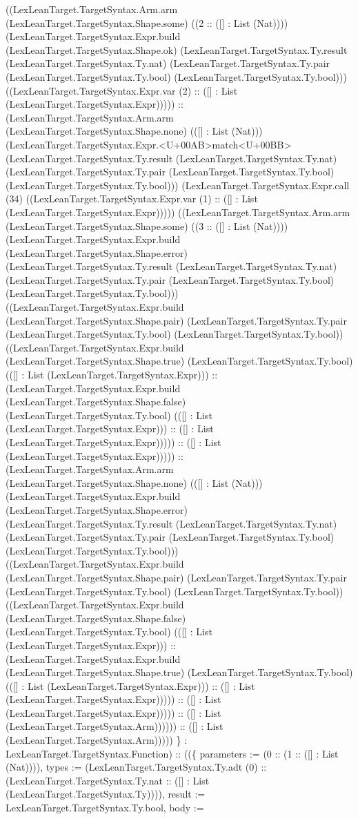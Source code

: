 \documentclass[11pt]{article}
\begin{document}
((LexLeanTarget.TargetSyntax.Arm.arm (LexLeanTarget.TargetSyntax.Shape.some) ((2 :: ([] : List (Nat)))) (LexLeanTarget.TargetSyntax.Expr.build (LexLeanTarget.TargetSyntax.Shape.ok) (LexLeanTarget.TargetSyntax.Ty.result (LexLeanTarget.TargetSyntax.Ty.nat) (LexLeanTarget.TargetSyntax.Ty.pair (LexLeanTarget.TargetSyntax.Ty.bool) (LexLeanTarget.TargetSyntax.Ty.bool))) ((LexLeanTarget.TargetSyntax.Expr.var (2) :: ([] : List (LexLeanTarget.TargetSyntax.Expr))))) :: (LexLeanTarget.TargetSyntax.Arm.arm (LexLeanTarget.TargetSyntax.Shape.none) (([] : List (Nat))) (LexLeanTarget.TargetSyntax.Expr.<U+00AB>match<U+00BB> (LexLeanTarget.TargetSyntax.Ty.result (LexLeanTarget.TargetSyntax.Ty.nat) (LexLeanTarget.TargetSyntax.Ty.pair (LexLeanTarget.TargetSyntax.Ty.bool) (LexLeanTarget.TargetSyntax.Ty.bool))) (LexLeanTarget.TargetSyntax.Expr.call (34) ((LexLeanTarget.TargetSyntax.Expr.var (1) :: ([] : List (LexLeanTarget.TargetSyntax.Expr))))) ((LexLeanTarget.TargetSyntax.Arm.arm (LexLeanTarget.TargetSyntax.Shape.some) ((3 :: ([] : List (Nat)))) (LexLeanTarget.TargetSyntax.Expr.build (LexLeanTarget.TargetSyntax.Shape.error) (LexLeanTarget.TargetSyntax.Ty.result (LexLeanTarget.TargetSyntax.Ty.nat) (LexLeanTarget.TargetSyntax.Ty.pair (LexLeanTarget.TargetSyntax.Ty.bool) (LexLeanTarget.TargetSyntax.Ty.bool))) ((LexLeanTarget.TargetSyntax.Expr.build (LexLeanTarget.TargetSyntax.Shape.pair) (LexLeanTarget.TargetSyntax.Ty.pair (LexLeanTarget.TargetSyntax.Ty.bool) (LexLeanTarget.TargetSyntax.Ty.bool)) ((LexLeanTarget.TargetSyntax.Expr.build (LexLeanTarget.TargetSyntax.Shape.true) (LexLeanTarget.TargetSyntax.Ty.bool) (([] : List (LexLeanTarget.TargetSyntax.Expr))) :: (LexLeanTarget.TargetSyntax.Expr.build (LexLeanTarget.TargetSyntax.Shape.false) (LexLeanTarget.TargetSyntax.Ty.bool) (([] : List (LexLeanTarget.TargetSyntax.Expr))) :: ([] : List (LexLeanTarget.TargetSyntax.Expr))))) :: ([] : List (LexLeanTarget.TargetSyntax.Expr))))) :: (LexLeanTarget.TargetSyntax.Arm.arm (LexLeanTarget.TargetSyntax.Shape.none) (([] : List (Nat))) (LexLeanTarget.TargetSyntax.Expr.build (LexLeanTarget.TargetSyntax.Shape.error) (LexLeanTarget.TargetSyntax.Ty.result (LexLeanTarget.TargetSyntax.Ty.nat) (LexLeanTarget.TargetSyntax.Ty.pair (LexLeanTarget.TargetSyntax.Ty.bool) (LexLeanTarget.TargetSyntax.Ty.bool))) ((LexLeanTarget.TargetSyntax.Expr.build (LexLeanTarget.TargetSyntax.Shape.pair) (LexLeanTarget.TargetSyntax.Ty.pair (LexLeanTarget.TargetSyntax.Ty.bool) (LexLeanTarget.TargetSyntax.Ty.bool)) ((LexLeanTarget.TargetSyntax.Expr.build (LexLeanTarget.TargetSyntax.Shape.false) (LexLeanTarget.TargetSyntax.Ty.bool) (([] : List (LexLeanTarget.TargetSyntax.Expr))) :: (LexLeanTarget.TargetSyntax.Expr.build (LexLeanTarget.TargetSyntax.Shape.true) (LexLeanTarget.TargetSyntax.Ty.bool) (([] : List (LexLeanTarget.TargetSyntax.Expr))) :: ([] : List (LexLeanTarget.TargetSyntax.Expr))))) :: ([] : List (LexLeanTarget.TargetSyntax.Expr))))) :: ([] : List (LexLeanTarget.TargetSyntax.Arm)))))) :: ([] : List (LexLeanTarget.TargetSyntax.Arm))))) \} : LexLeanTarget.TargetSyntax.Function) :: ((\{ parameters := (0 :: (1 :: ([] : List (Nat)))), types := (LexLeanTarget.TargetSyntax.Ty.adt (0) :: (LexLeanTarget.TargetSyntax.Ty.nat :: ([] : List (LexLeanTarget.TargetSyntax.Ty)))), result := LexLeanTarget.TargetSyntax.Ty.bool, body := 
\end{document}
